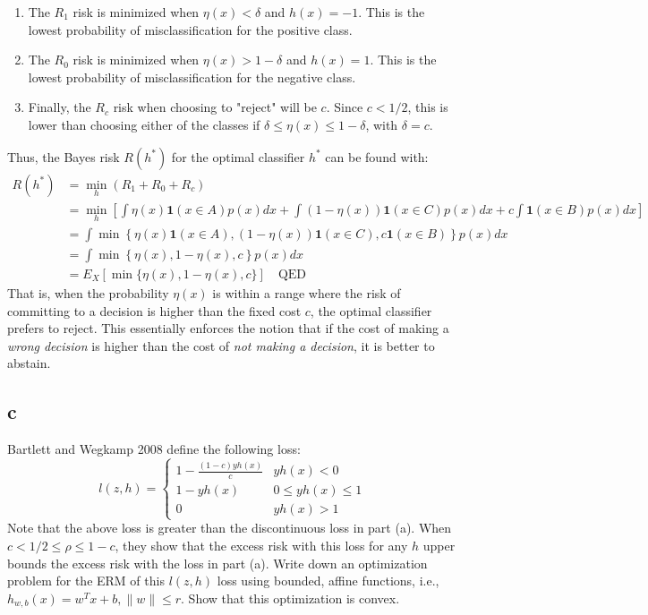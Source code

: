 \documentclass{article}
\begin{document}
\begin{enumerate}
    \item The \( R_1 \) risk is minimized when \( \eta(x) < \delta \) and \( h(x) = -1 \).
    This is the lowest probability of misclassification for the positive class. 
    \item The \( R_0 \) risk is minimized when \( \eta(x) > 1 - \delta \) and \( h(x) = 1 \).
    This is the lowest probability of misclassification for the negative class.
    \item Finally, the \( R_c \) risk when choosing to "reject" will be \( c \).
    Since $c < 1/2$, this is lower than choosing either of the classes if \( \delta \leq \eta(x) \leq 1 - \delta \), with \( \delta = c \).
\end{enumerate}
Thus, the Bayes risk \( R(h^*) \) for the optimal classifier \( h^* \) can be found with:
\begin{align*}
    R(h^*) &= \min_{h} \left( R_1 + R_0 + R_c \right) \\
    &= \min_{h} \left[ \int \eta(x) \mathbf{1}(x \in A) p(x) dx + \int (1 - \eta(x)) \mathbf{1}(x \in C) p(x) dx + c \int \mathbf{1}(x \in B) p(x) dx \right] \\
    &= \int \min \left\{ \eta(x) \mathbf{1}(x \in A), (1 - \eta(x)) \mathbf{1}(x \in C), c \mathbf{1}(x \in B) \right\} p(x) dx \\
    &= \int \min \left\{ \eta(x), 1 - \eta(x), c \right\} p(x) dx \\
    &= E_X[\min \{ \eta(x), 1 - \eta(x), c \}] \quad \text{QED}
\end{align*}
That is, when the probability $\eta(x)$ is within a range where the risk of committing to a decision is higher than the fixed cost $c$, the optimal classifier prefers to reject.
This essentially enforces the notion that if the cost of making a \textit{wrong decision} is higher than the cost of \textit{not making a decision}, it is better to abstain.

\subsection{c}
Bartlett and Wegkamp 2008 define the following loss:
\begin{equation*}
l(z,h) = \begin{cases}
    1 - \frac{(1-c)yh(x)}{c} & yh(x) < 0\\
    1 - yh(x) & 0 \leq yh(x) \leq 1\\
    0 & yh(x) > 1
    \end{cases}
\end{equation*}
Note that the above loss is greater than the discontinuous loss in part (a).
When $c < 1/2 \leq \rho \leq 1 - c$, they show that the excess risk with this loss for any $h$ upper bounds the excess risk with the loss in part (a).
Write down an optimization problem for the ERM of this $l(z,h)$ loss using bounded, affine functions, i.e., $h_{w,b}(x) = w^Tx + b, \|w\| \leq r$.
Show that this optimization is convex.
\end{document}
